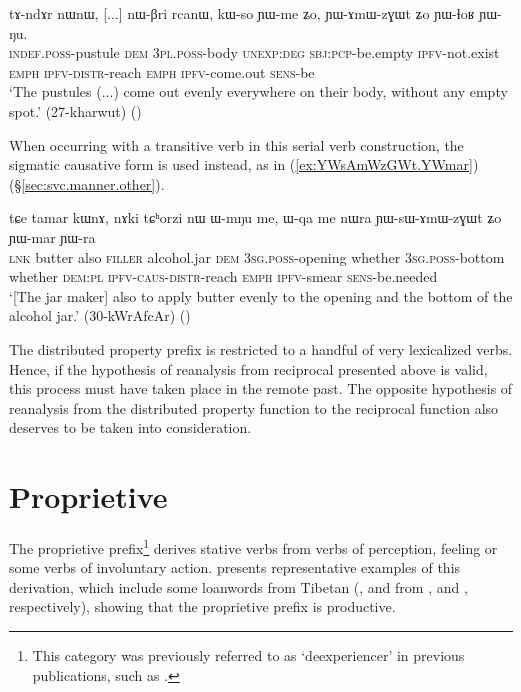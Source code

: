 \begin{exe}
\ex \label{ex:YAmWzGWt.YWlhoR}
\gll  tɤ-ndɤr nɯnɯ, [...] nɯ-βri rcanɯ, kɯ-so ɲɯ-me ʑo, ɲɯ-ɤmɯ-zɣɯt ʑo ɲɯ-ɬoʁ ɲɯ-ŋu. \\
\textsc{indef}.\textsc{poss}-pustule \textsc{dem} { } \textsc{3pl}.\textsc{poss}-body \textsc{unexp}:\textsc{deg} \textsc{sbj}:\textsc{pcp}-be.empty \textsc{ipfv}-not.exist \textsc{emph} \textsc{ipfv}-\textsc{distr}-reach \textsc{emph} \textsc{ipfv}-come.out \textsc{sens}-be \\
\glt `The pustules (...) come out evenly everywhere on their body, without any empty spot.' (27-kharwut) ()
\end{exe} 

When occurring with a transitive verb in this serial verb construction, the sigmatic causative form  is used instead, as in (\ref{ex:YWsAmWzGWt.YWmar}) (§\ref{sec:svc.manner.other}).

\begin{exe}
\ex \label{ex:YWsAmWzGWt.YWmar}
\gll tɕe tamar kɯnɤ, nɤki tɕʰorzi nɯ ɯ-mŋu me,  ɯ-qa me nɯra ɲɯ-sɯ-ɤmɯ-zɣɯt ʑo ɲɯ-mar ɲɯ-ra  \\
\textsc{lnk} butter also \textsc{filler} alcohol.jar \textsc{dem} \textsc{3sg}.\textsc{poss}-opening whether \textsc{3sg}.\textsc{poss}-bottom whether \textsc{dem}:\textsc{pl} \textsc{ipfv}-\textsc{caus}-\textsc{distr}-reach \textsc{emph} \textsc{ipfv}-smear \textsc{sens}-be.needed \\
\glt `[The jar maker] also to apply butter evenly to the opening and the  bottom of the alcohol jar.' (30-kWrAfcAr) ()
\end{exe} 

The distributed property  prefix is restricted to a handful of very lexicalized verbs. Hence, if the hypothesis of reanalysis from reciprocal presented above is valid, this process must have taken place in the remote past. The opposite hypothesis of reanalysis from the distributed property function to the reciprocal function also deserves to be taken into consideration.

\section{Proprietive} \label{sec:proprietive}
The proprietive  prefix\footnote{This category was previously referred to as `deexperiencer' in previous publications, such as \citet{jacques12demotion}. } derives stative verbs from verbs of perception, feeling or some verbs of involuntary action.  presents representative examples of this derivation, which include some loanwords from Tibetan (,  and 
 from ,  and , respectively), showing that the proprietive prefix is productive.
 
